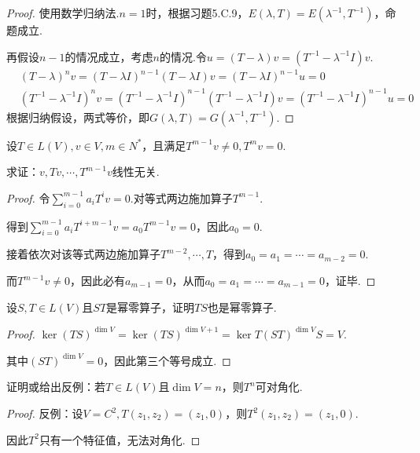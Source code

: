 \begin{proof}
    使用数学归纳法.\(n=1\)时，根据习题5.C.9，\(E(\lambda,T)=E(\lambda^{-1},T^{-1})\)，命题成立.
    
    再假设\(n-1\)的情况成立，考虑\(n\)的情况.令\(u=(T-\lambda)v=(T^{-1}-\lambda^{-1} I)v\).
    \begin{align*}
        &(T-\lambda)^n v=(T-\lambda I)^{n-1}(T-\lambda I)v=(T-\lambda I)^{n-1}u=0 \\
        &(T^{-1}-\lambda^{-1} I)^n v=(T^{-1}-\lambda^{-1} I)^{n-1}(T^{-1}-\lambda^{-1} I)v
            =(T^{-1}-\lambda^{-1} I)^{n-1}u=0
    \end{align*}
    根据归纳假设，两式等价，即\(G(\lambda,T)=G(\lambda^{-1},T^{-1})\).
\end{proof}

\begin{problem}[5]\label{8.A.5}
    设\(T \in L(V),v \in V,m \in N^*\)，且满足\(T^{m-1}v \ne 0,T^m v=0\).
    
    求证：\(v,Tv,\cdots,T^{m-1}v\)线性无关.
\end{problem}

\begin{proof}
    令\(\sum_{i=0}^{m-1} a_iT^i v=0\).对等式两边施加算子\(T^{m-1}\).

    得到\(\sum_{i=0}^{m-1} a_iT^{i+m-1} v=a_0T^{m-1} v=0\)，因此\(a_0=0\).
    
    接着依次对该等式两边施加算子\(T^{m-2},\cdots,T\)，得到\(a_0=a_1=\cdots=a_{m-2}=0\).
    
    而\(T^{m-1}v \ne 0\)，因此必有\(a_{m-1}=0\)，从而\(a_0=a_1=\cdots=a_{m-1}=0\)，证毕.
\end{proof}

\begin{problem}[9]\label{8.A.9}
    设\(S,T \in L(V)\)且\(ST\)是幂零算子，证明\(TS\)也是幂零算子.
\end{problem}

\begin{proof}
    \(\ker (TS)^{\dim V}=\ker (TS)^{\dim V+1}=\ker T(ST)^{\dim V}S=V\).

    其中\((ST)^{\dim V}=0\)，因此第三个等号成立.
\end{proof}

\begin{problem}[11]\label{8.A.11}
    证明或给出反例：若\(T \in L(V)\)且\(\dim V=n\)，则\(T^n\)可对角化.
\end{problem}

\begin{proof}
    反例：设\(V=C^2,T(z_1,z_2)=(z_1,0)\)，则\(T^2(z_1,z_2)=(z_1,0)\).

    因此\(T^2\)只有一个特征值，无法对角化.
\end{proof}

